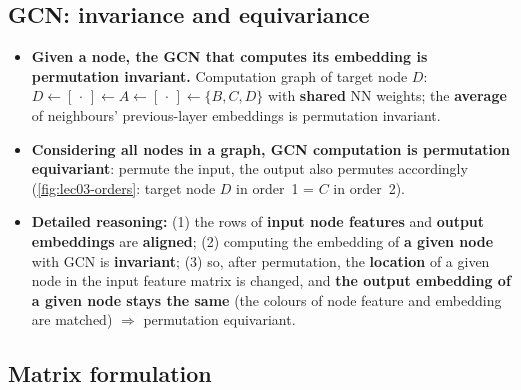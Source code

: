 \subsection{GCN: invariance and equivariance}\label{sec:lec03-gcn-inv}

\begin{itemize}
  \item \textbf{Given a node, the GCN that computes its embedding is
    permutation invariant.} Computation graph of target node $D$:
    $D \leftarrow [\,\cdot\,] \leftarrow A \leftarrow [\,\cdot\,] \leftarrow
    \{B,C,D\}$ with \textbf{shared} NN weights; the \textbf{average} of
    neighbours' previous-layer embeddings is permutation invariant.
  \item \textbf{Considering all nodes in a graph, GCN computation is
    permutation equivariant}: permute the input, the output also permutes
    accordingly (\cref{fig:lec03-orders}: target node $D$ in order~1 = $C$ in
    order~2).
  \item \textbf{Detailed reasoning:} (1) the rows of \textbf{input node
    features} and \textbf{output embeddings} are \textbf{aligned}; (2)
    computing the embedding of \textbf{a given node} with GCN is
    \textbf{invariant}; (3) so, after permutation, the \textbf{location} of a
    given node in the input feature matrix is changed, and \textbf{the output
    embedding of a given node stays the same} (the colours of node feature and
    embedding are matched) $\Rightarrow$ permutation equivariant.
\end{itemize}

\subsection{Matrix formulation}\label{sec:lec03-matrix}

